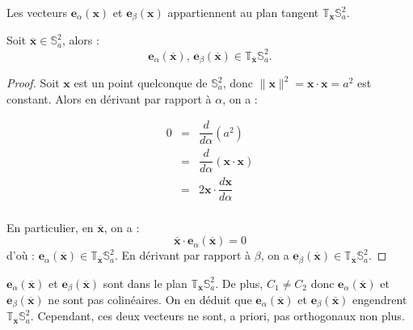 Les vecteurs $\mathbf{e}_{\alpha}(\mathbf{x})$ et $\mathbf{e}_{\beta}(\mathbf{x})$ appartiennent au plan tangent $\mathbb{T}_{\mathbf{x}} \mathbb{S}_a^2$.

\begin{proposition}
Soit $\overline{\mathbf{x}} \in \mathbb{S}_a^2$, alors :
\begin{equation}
\mathbf{e}_{\alpha}(\overline{\mathbf{x}})\text{, } \mathbf{e}_{\beta}(\overline{\mathbf{x}}) \in \mathbb{T}_{\overline{\mathbf{x}}} \mathbb{S}_a^2.
\end{equation}
\end{proposition}


\begin{proof}
Soit $\mathbf{x}$ est un point quelconque de $\mathbb{S}_a^2$, donc $\| \mathbf{x} \|^2 = \mathbf{x} \cdot \mathbf{x} = a^2$ est constant.
Alors en dérivant par rapport à $\alpha$, on a :
 
\begin{equation*}
\begin{array}{rcl}
0 & = & \dfrac{d}{d \alpha} ( a^2 )\\
  & = & \dfrac{d}{d \alpha} ( \mathbf{x} \cdot \mathbf{x} )\\
  & = & 2 \mathbf{x} \cdot \dfrac{d \mathbf{x}}{d \alpha}\\
\end{array}
\end{equation*}

En particulier, en $\overline{\mathbf{x}}$, on a :
\begin{equation}
\overline{\mathbf{x}} \cdot \mathbf{e}_{\alpha}(\overline{\mathbf{x}}) = 0
\end{equation}
d'où : $\mathbf{e}_{\alpha}(\overline{\mathbf{x}}) \in \mathbb{T}_{\overline{\mathbf{x}}} \mathbb{S}_a^2$. En dérivant par rapport à $\beta$, on a $\mathbf{e}_{\beta}(\overline{\mathbf{x}}) \in \mathbb{T}_{\overline{\mathbf{x}}} \mathbb{S}_a^2$.
\end{proof}

$\mathbf{e}_{\alpha}(\overline{\mathbf{x}})$ et $\mathbf{e}_{\beta}(\overline{\mathbf{x}})$ sont dans le plan $\mathbb{T}_{\overline{\mathbf{x}}}\mathbb{S}_a^2$. De plus, $C_1 \neq C_2$ donc $\mathbf{e}_{\alpha}(\overline{\mathbf{x}})$ et $\mathbf{e}_{\beta}(\overline{\mathbf{x}})$ ne sont pas colinéaires. On en déduit que $\mathbf{e}_{\alpha}(\overline{\mathbf{x}})$ et $\mathbf{e}_{\beta}(\overline{\mathbf{x}})$ engendrent $\mathbb{T}_{\overline{\mathbf{x}}} \mathbb{S}_a^2$. Cependant, ces deux vecteurs ne sont, a priori, pas orthogonaux non plus.

